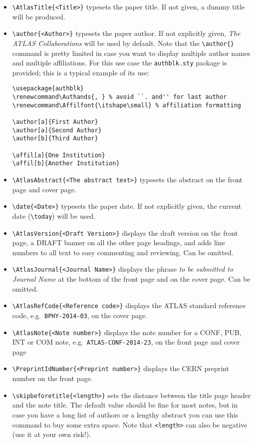 \documentclass[UKenglish]{style/atlasdoc}
\begin{document}
\begin{itemize}
  \item {\verb|\AtlasTitle{<Title>}|} typesets the paper title. If not
    given, a dummy title will be produced.

  \item {\verb|\author{<Author>}|} typesets the paper author. If not
    explicitly given, \emph{The ATLAS Collaborations} will be used by
    default. Note that the \verb|\author{}| command is pretty limited
    in case you want to display multiple author names and multiple
    affiliations. For this use case the \verb|authblk.sty| package is
    provided; this is a typical example of its use:
    \begin{verbatim}
\usepackage{authblk}
\renewcommand\Authands{, } % avoid ``. and'' for last author
\renewcommand\Affilfont{\itshape\small} % affiliation formatting

\author[a]{First Author}
\author[a]{Second Author}
\author[b]{Third Author}

\affil[a]{One Institution}
\affil[b]{Another Institution}
    \end{verbatim}

  \item {\verb|\AtlasAbstract{<The abstract text>}|} typesets the
    abstract on the front page and cover page.

  \item {\verb|\date{<Date>}|} typesets the paper date. If not
    explicitly given, the current date (\verb|\today|) will be used.

  \item {\verb|\AtlasVersion{<Draft Version>}|} displays the draft
    version on the front page, a DRAFT banner on all the other page
    headings, and adds line numbers to all text to easy commenting and
    reviewing. Can be omitted.

  \item {\verb|\AtlasJournal{<Journal Name>}|} displays the phrase \emph{to
    be submitted to Journal Name} at the bottom of the front page and
    on the cover page. Can be omitted.

  \item {\verb|\AtlasRefCode{<Reference code>}|} displays the ATLAS
    standard reference code, e.g.\ \texttt{BPHY-2014-03}, on the cover page.

  \item {\verb|\AtlasNote{<Note number>}|} displays the note number
  	for a CONF, PUB, INT or COM note, e.g.\ \texttt{ATLAS-CONF-2014-23},
  	on the front page and cover page

  \item {\verb|\PreprintIdNumber{<Preprint number>}|} displays the CERN
  	preprint number on the front page.

  \item {\verb|\skipbeforetitle{<length>}|} sets the distance between
    the title page header and the note title. The default value should
    be fine for most notes, but in case you have a long list of
    authors or a lengthy abstract you can use this command to buy
    some extra space. Note that \verb|<length>| can also be negative
    (use it at your own risk!).
\end{itemize}
\end{document}
